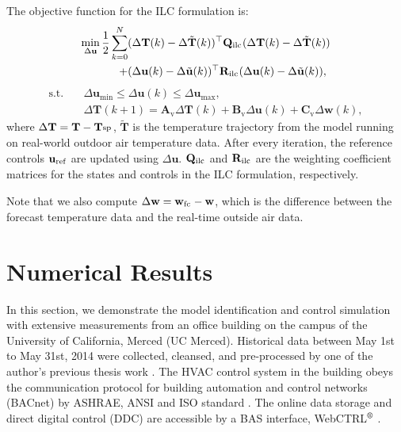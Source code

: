 \documentclass[conference]{IEEEtran}
\begin{document}
The objective function for the ILC formulation is:
\begin{align}
\nonumber
\min\limits_{\Delta\mathbf{u}}\frac{1}{2}\sum_{k=0}^{N}&(\Delta\mathbf{T}(k)-\Delta\tilde{\mathbf{T}}(k))^\top\mathbf{Q}_{\textsuperscript{ilc}}(\Delta\mathbf{T}(k)-\Delta\tilde{\mathbf{T}}(k))\\
+ & (\Delta\mathbf{u}(k)-\Delta\tilde{\mathbf{u}}(k))^\top\mathbf{R}_{\textsuperscript{ilc}}(\Delta\mathbf{u}(k)-\Delta\tilde{\mathbf{u}}(k)), \label{DeltaJ}%
\end{align}
\begin{subequations}
\begin{align}
\textrm{s.t.} \quad & \Delta\mathbf{u}_{\min}\leq\Delta\mathbf{u}(k)\leq\Delta\mathbf{u}_{\max},\label{DeltaBounds}\\
&\Delta\mathbf{T}(k+1) = \mathbf{A}_{\textrm{v}}\Delta\mathbf{T}(k) + \mathbf{B}_{\textrm{v}}\Delta\mathbf{u}(k) + \mathbf{C}_{\textrm{v}}\Delta\mathbf{w}(k),\label{DeltaEqnofDynamicalConstraints}
\end{align}
\end{subequations}
where $\Delta\mathbf{T} = \mathbf{T} - \mathbf{T}_{\textsuperscript{sp}}$, $\tilde{\mathbf{T}}$ is the temperature trajectory from the model running on real-world outdoor air temperature data. After every iteration, the reference controls $\mathbf{u}_{\textsuperscript{ref}}$ are updated using $\Delta\mathbf{u}$. $\mathbf{Q}_{\textsuperscript{ilc}}$ and $\mathbf{R}_{\textsuperscript{ilc}}$ are the weighting coefficient matrices for the states and controls in the ILC formulation, respectively.

Note that we also compute $\Delta\mathbf{w} = \mathbf{w}_\textsuperscript{fc} - \mathbf{w}$, which is the difference between the forecast temperature data and the real-time outside air data.

\section{Numerical Results}
In this section, we demonstrate the model identification and control simulation with extensive measurements from an office building on the campus of the University of California, Merced (UC Merced). Historical data between May 1st to May 31st, 2014 were collected, cleansed, and pre-processed by one of the author's previous thesis work \cite{liang2014modeling}. The HVAC control system in the building obeys the communication protocol for building automation and control networks (BACnet) by ASHRAE, ANSI and ISO standard \cite{bushby1997bacnettm}. The online data storage and direct digital control (DDC) are accessible by a BAS interface, WebCTRL$\textsuperscript{\textregistered}$ \cite{webctrl2022alc}.
\end{document}
